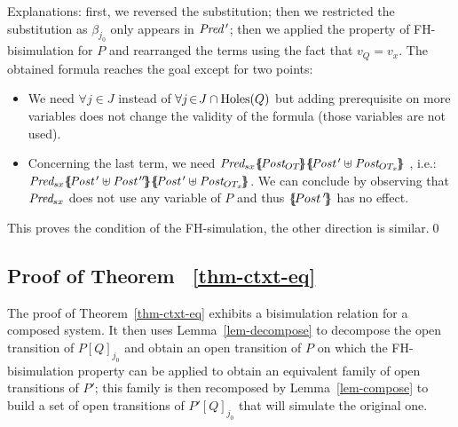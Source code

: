\documentclass{lncs/llncs}
\begin{document}
 Explanations: first, we reversed the substitution; then we
 restricted the 
 substitution as $\beta_{j_0}$ only appears in $\Pred\,'$; then we
 applied the property of FH-bisimulation for $P$ and rearranged the
 terms using the fact that $v_Q=v_x$. The obtained formula reaches the goal except for 
 two points:\\[-4.3ex] 
 \begin{itemize}
 	\item We need $\forall j\!\in\! J$ instead of $\forall j\!\in\! J\cap\operatorname{Holes}(Q)$  but  
 	adding prerequisite on more variables 
 	does not 
 	change the validity of the formula (those variables are not used).
 	\item Concerning the last term, we need 
 	$\Pred_{s x}\subst{\Post_{OT}}\subst{\Post\,'\uplus \Post_{OT_x}}$ 
 	, i.e.:
 	$\Pred_{s x}\subst{\Post\,'\uplus 
 		\Post\,''}\subst{\Post\,'\uplus \Post_{OT_x}}$. We 
 	can conclude by observing that	$\Pred_{s x}$ does not use any variable of $P$ 
 	and thus $\{\hspace{-0.88ex}\{\!Post\,'\!\}\hspace{-0.87ex}\}$ has no effect.
 \end{itemize}	
 This proves the  condition of the FH-simulation, the other direction is 
 similar.\qed
 
        \subsection{Proof of Theorem ~\ref{thm-ctxt-eq}}

The proof of Theorem~\ref{thm-ctxt-eq} exhibits  a bisimulation relation for a 
composed system. It then uses  Lemma~\ref{lem-decompose} to decompose the open transition 
of $P[Q]_{j_0}$ and obtain an open transition of $P$ on which the FH-bisimulation 
property can 
be applied  to obtain an equivalent family of open transitions of $P'$; this family is 
then recomposed by Lemma~\ref{lem-compose} to build a set of open transitions of 
$P'[Q]_{j_0}$ 
that will simulate the original one.
\end{document}
